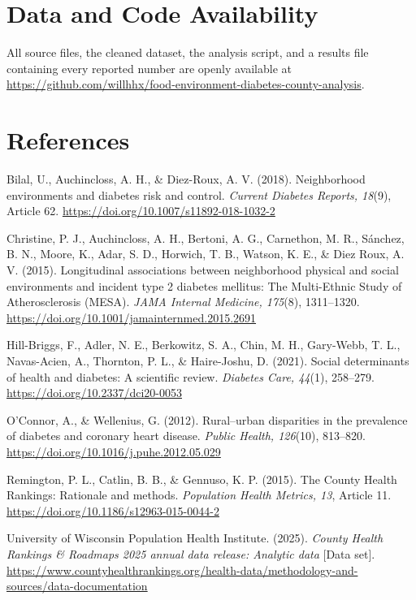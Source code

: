 \documentclass[12pt]{article}
\begin{document}
\section*{Data and Code Availability}
All source files, the cleaned dataset, the analysis script, and a results file containing every reported number are openly available at \url{https://github.com/willhhx/food-environment-diabetes-county-analysis}.

\section*{References}
\begingroup\small\setlength{\parindent}{-0.5in}\setlength{\leftskip}{0.5in}\setlength{\parskip}{4pt}
Bilal, U., Auchincloss, A. H., \& Diez-Roux, A. V. (2018). Neighborhood environments and diabetes risk and control. \emph{Current Diabetes Reports, 18}(9), Article 62. \url{https://doi.org/10.1007/s11892-018-1032-2}

Christine, P. J., Auchincloss, A. H., Bertoni, A. G., Carnethon, M. R., S\'anchez, B. N., Moore, K., Adar, S. D., Horwich, T. B., Watson, K. E., \& Diez Roux, A. V. (2015). Longitudinal associations between neighborhood physical and social environments and incident type 2 diabetes mellitus: The Multi-Ethnic Study of Atherosclerosis (MESA). \emph{JAMA Internal Medicine, 175}(8), 1311--1320. \url{https://doi.org/10.1001/jamainternmed.2015.2691}

Hill-Briggs, F., Adler, N. E., Berkowitz, S. A., Chin, M. H., Gary-Webb, T. L., Navas-Acien, A., Thornton, P. L., \& Haire-Joshu, D. (2021). Social determinants of health and diabetes: A scientific review. \emph{Diabetes Care, 44}(1), 258--279. \url{https://doi.org/10.2337/dci20-0053}

O'Connor, A., \& Wellenius, G. (2012). Rural--urban disparities in the prevalence of diabetes and coronary heart disease. \emph{Public Health, 126}(10), 813--820. \url{https://doi.org/10.1016/j.puhe.2012.05.029}

Remington, P. L., Catlin, B. B., \& Gennuso, K. P. (2015). The County Health Rankings: Rationale and methods. \emph{Population Health Metrics, 13}, Article 11. \url{https://doi.org/10.1186/s12963-015-0044-2}

University of Wisconsin Population Health Institute. (2025). \emph{County Health Rankings \& Roadmaps 2025 annual data release: Analytic data} [Data set]. \url{https://www.countyhealthrankings.org/health-data/methodology-and-sources/data-documentation}
\end{document}
